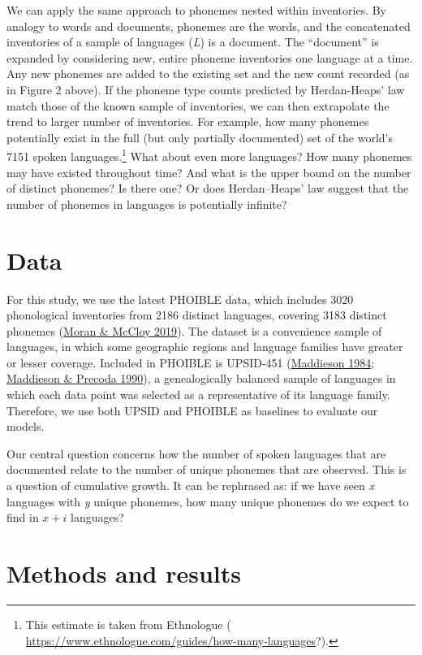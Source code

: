 \documentclass[
]{article}
\begin{document}
We can apply the same approach to phonemes nested within inventories. By
analogy to words and documents, phonemes are the words, and the
concatenated inventories of a sample of languages (\emph{L}) is a
document. The ``document'' is expanded by considering new, entire
phoneme inventories one language at a time. Any new phonemes are added
to the existing set and the new count recorded (as in Figure 2 above).
If the phoneme type counts predicted by Herdan-Heaps' law match those of
the known sample of inventories, we can then extrapolate the trend to
larger number of inventories. For example, how many phonemes potentially
exist in the full (but only partially documented) set of the world's
7151 spoken languages.\footnote{This estimate is taken from Ethnologue (
  \url{https://www.ethnologue.com/guides/how-many-languages}?).} What
about even more languages? How many phonemes may have existed throughout
time? And what is the upper bound on the number of distinct phonemes? Is
there one? Or does Herdan--Heaps' law suggest that the number of
phonemes in languages is potentially infinite?

\hypertarget{data}{%
\section{Data}\label{data}}

For this study, we use the latest PHOIBLE data, which includes 3020
phonological inventories from 2186 distinct languages, covering 3183
distinct phonemes (\protect\hyperlink{ref-MoranMcCloy2019}{Moran \&
McCloy 2019}). The dataset is a convenience sample of languages, in
which some geographic regions and language families have greater or
lesser coverage. Included in PHOIBLE is UPSID-451
(\protect\hyperlink{ref-Maddieson1984}{Maddieson 1984};
\protect\hyperlink{ref-MaddiesonPrecoda1990}{Maddieson \& Precoda
1990}), a genealogically balanced sample of languages in which each data
point was selected as a representative of its language family.
Therefore, we use both UPSID and PHOIBLE as baselines to evaluate our
models.

Our central question concerns how the number of spoken languages that
are documented relate to the number of unique phonemes that are
observed. This is a question of cumulative growth. It can be rephrased
as: if we have seen \emph{x} languages with \emph{y} unique phonemes,
how many unique phonemes do we expect to find in \(x + i\) languages?

\hypertarget{methods-and-results}{%
\section{Methods and results}\label{methods-and-results}}
\end{document}
